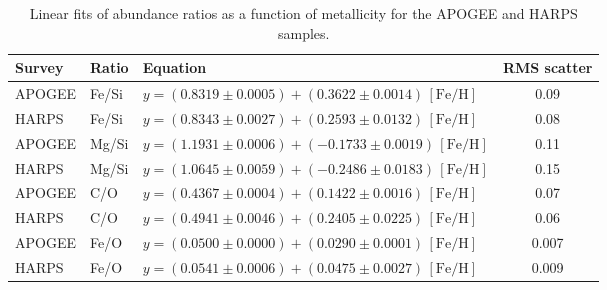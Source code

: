 \documentclass{aa}
\begin{document}
\begin{table}
\caption{Linear fits of abundance ratios as a function of metallicity for the APOGEE and HARPS samples.}
\label{tab:ratio_slopes_rms}
\centering
\small
\begin{tabular}{lllc}
\hline\hline
Survey & Ratio & Equation & RMS scatter \\
\hline
APOGEE & Fe/Si & $y = (0.8319 \pm 0.0005) + (0.3622 \pm 0.0014)\,[\mathrm{Fe/H}]$ & 0.09 \\
HARPS & Fe/Si & $y = (0.8343 \pm 0.0027) + (0.2593 \pm 0.0132)\,[\mathrm{Fe/H}]$ & 0.08 \\
APOGEE & Mg/Si & $y = (1.1931 \pm 0.0006) + (-0.1733 \pm 0.0019)\,[\mathrm{Fe/H}]$ & 0.11 \\
HARPS & Mg/Si & $y = (1.0645 \pm 0.0059) + (-0.2486 \pm 0.0183)\,[\mathrm{Fe/H}]$ & 0.15 \\
APOGEE & C/O & $y = (0.4367 \pm 0.0004) + (0.1422 \pm 0.0016)\,[\mathrm{Fe/H}]$ & 0.07 \\
HARPS & C/O & $y = (0.4941 \pm 0.0046) + (0.2405 \pm 0.0225)\,[\mathrm{Fe/H}]$ & 0.06 \\
APOGEE & Fe/O & $y = (0.0500 \pm 0.0000) + (0.0290 \pm 0.0001)\,[\mathrm{Fe/H}]$ & 0.007 \\
HARPS & Fe/O & $y = (0.0541 \pm 0.0006) + (0.0475 \pm 0.0027)\,[\mathrm{Fe/H}]$ & 0.009 \\
\hline
\end{tabular}
\end{table}
\end{document}
